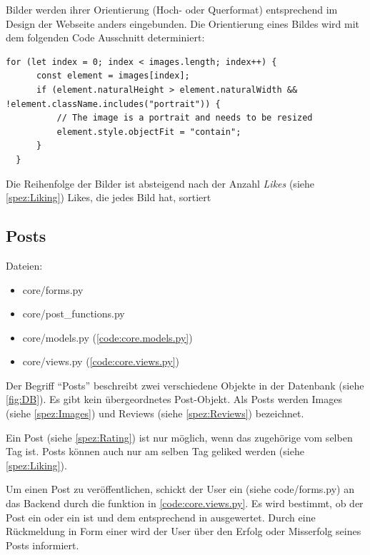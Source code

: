 Bilder werden ihrer Orientierung (Hoch- oder Querformat) entsprechend im Design
der Webseite anders eingebunden. Die Orientierung eines Bildes wird mit dem
folgenden Code Ausschnitt determiniert:

\begin{lstlisting}
for (let index = 0; index < images.length; index++) {
      const element = images[index];
      if (element.naturalHeight > element.naturalWidth && !element.className.includes("portrait")) {
          // The image is a portrait and needs to be resized
          element.style.objectFit = "contain";
      }
  }
\end{lstlisting}

Die Reihenfolge der Bilder ist absteigend nach der Anzahl \emph{Likes} (siehe
\ref{spez:Liking}) Likes, die jedes Bild hat, sortiert


\subsection{Posts} \label{spez:Posts}

Dateien:
\begin{itemize}
    \item core/forms.py 
    \item core/post\_functions.py
    \item core/models.py (\ref{code:core.models.py})
    \item core/views.py (\ref{code:core.views.py})
\end{itemize}

Der Begriff ``Posts'' beschreibt zwei verschiedene Objekte in der Datenbank (siehe
\ref{fig:DB}). Es gibt kein übergeordnetes Post-Objekt. Als Posts werden Images
(siehe \ref{spez:Images}) und Reviews (siehe \ref{spez:Reviews}) bezeichnet.

Ein Post (siehe \ref{spez:Rating}) ist nur möglich, wenn das zugehörige
 vom selben Tag ist. Posts können auch nur am selben Tag geliked
werden (siehe \ref{spez:Liking}).

Um einen Post zu veröffentlichen, schickt der User ein  (siehe code/forms.py) an
das Backend durch die  funktion in 
\ref{code:core.views.py}. Es wird bestimmt, ob der Post ein  oder
ein  ist und dem entsprechend in 
ausgewertet. Durch eine Rückmeldung in Form einer  wird der
User über den Erfolg oder Misserfolg seines Posts informiert.

